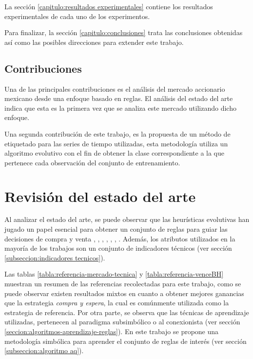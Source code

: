 \documentclass[12pt]{report}
\theoremstyle{break}
\theoremstyle{break}
\begin{document}
La sección \ref{capitulo:resultados experimentales} contiene los resultados experimentales de cada uno de los experimentos.

Para finalizar, la sección \ref{capitulo:conclusiones} trata las conclusiones obtenidas así como las posibles direcciones para extender este trabajo.

\section{Contribuciones}
\label{seccion:contribuciones}
Una de las principales contribuciones es el análisis del mercado accionario mexicano desde una enfoque basado en reglas. El análisis del estado del arte indica que esta es la primera vez que se analiza este mercado utilizando dicho enfoque.

Una segunda contribución de este trabajo, es la propuesta de un método de etiquetado para las series de tiempo utilizadas, esta metodología utiliza un algoritmo evolutivo con el fin de obtener la clase correspondiente a la que pertenece cada observación del conjunto de entrenamiento.

\chapter[Capítulo \thechapter: Revisión del estado del arte]{Revisión del estado del arte}
\label{capitulo:antecedentes}

Al analizar el estado del arte, se puede observar que las heurísticas evolutivas han jugado un papel esencial para obtener un conjunto de reglas para guiar las decisiones de compra y venta \cite{Allen1999}, \cite{Canelas2012-gecco}, \cite{Canelas2013-gecco}, \cite{Canelas2013-journal}, \cite{Leitao2016}, \cite{Potvin2004}, \cite{Kampouridis2017}. Además, los atributos utilizados en la mayoría de los trabajos son un conjunto de indicadores técnicos (ver sección \ref{subseccion:indicadores tecnicos}).

Las tablas \ref{tabla:referencia-mercado-tecnica} y \ref{tabla:referencia-venceBH} muestran un resumen de las referencias recolectadas para este trabajo, como se puede observar existen resultados mixtos en cuanto a obtener mejores ganancias que la estrategia \textit{compra y espera}, la cual es comúnmente  utilizada como la estrategia de referencia. Por otra parte, se observa que las técnicas de aprendizaje utilizadas, pertenecen al paradigma subsimbólico o al conexionista (ver sección \ref{seccion:algoritmos-aprendizaje-reglas}). En este trabajo se propone una metodología simbólica para aprender el conjunto de reglas de interés (ver sección \ref{subseccion:algoritmo aq}).
\end{document}
